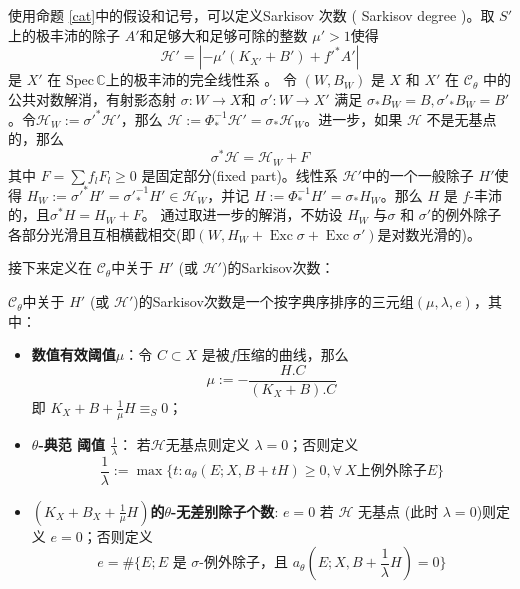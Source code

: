 使用命题 \ref{cat}中的假设和记号，可以定义Sarkisov 次数 ( Sarkisov degree )。取 $S'$ 上的极丰沛的除子 $A'$和足够大和足够可除的整数 $\mu'>1 $使得
\[ \mathcal{H}'=|-\mu' (K_{X'}+B') +f'^*A'| \]
是 $ X' $ 在 $ \mathrm{Spec}\,\mathbb{C}$上的极丰沛的完全线性系 。 令 $ (W,B_W) $ 是 $ X $ 和 $ X' $ 在 $ \mathcal{C}_{\theta} $ 中的公共对数解消，有射影态射 $ \sigma:W\to X$和   $\sigma':W\to X' $ 满足 $\sigma_*B_W=B, \sigma'_*B_W=B' $。令$\mathcal{H}_W:=\sigma'^*\mathcal{H}'$，那么  $\mathcal{H}:=\Phi^{-1}_*\mathcal{H}'=\sigma_*\mathcal{H}_W$。进一步，如果 $ \mathcal{H} $ 不是无基点的，那么
\[ \sigma^*\mathcal{H}=\mathcal{H}_W+F \]
其中 $ F=\sum f_{l}F_{l}\geqslant0 $ 是固定部分(fixed part)。线性系 $ \mathcal{H}' $中的一个一般除子 $H'$使得 $ H_W:=\sigma'^*H'=\sigma'^{-1}_*H'\in \mathcal{H}_W $，并记 $ H:=\Phi^{-1}_*H'=\sigma_*H_{W} $。那么 $H$ 是 $f$-丰沛的，且$ \sigma^*H=H_W+F $。 通过取进一步的解消，不妨设 $H_{W}$ 与$\sigma$ 和 $\sigma'$的例外除子各部分光滑且互相横截相交(即$(W,H_{W}+ \operatorname{Exc}\sigma+ \operatorname{Exc}\sigma')$是对数光滑的)。


接下来定义在 $\mathcal{C}_{\theta}$中关于 $H'$ (或 $\mathcal{H}'$)的Sarkisov次数：
\begin{definition}\label{sarkisovdegree}
  \cite[Definition 3.8]{brunoLogSarkisovProgram1995}
 $\mathcal{C}_{\theta}$中关于 $H'$ (或 $\mathcal{H}'$)的Sarkisov次数是一个按字典序排序的三元组$ (\mu,\lambda,e) $，其中：
  \begin{itemize}
    \item \textbf{ 数值有效阈值$ \mu $}：令 $ C\subset X  $ 是被$ f $压缩的曲线，那么
          \[ \mu:=-\frac{H.C}{(K_X+B).C} \]
          即 $ K_X+B+\frac{1}{\mu} H \equiv_S0$；
    \item \textbf{$ \theta $-典范 阈值  $ \frac{1}{\lambda} $}：  若$ \mathcal{H} $无基点则定义 $\lambda=0$；否则定义
          \[ \frac{1}{\lambda}:=\max\{t:a_{\theta}(E;X,B+tH)\geqslant 0,  \forall \ X\text{上例外除子}E \}\]
    \item \textbf{ $(K_{X}+B_{X}+\frac{1}{\mu}H)$的$\theta$-无差别除子个数}:  $ e=0 $ 若 $ \mathcal{H} $ 无基点 (此时 $ \lambda=0 $)则定义  $e=0$；否则定义
          \[ e=\#\{E; E \text{ 是 }\sigma\text{-例外除子，且 } a_{\theta}(E;X,B+\frac{1}{\lambda} H)=0 \} \]
  \end{itemize}
\end{definition}

